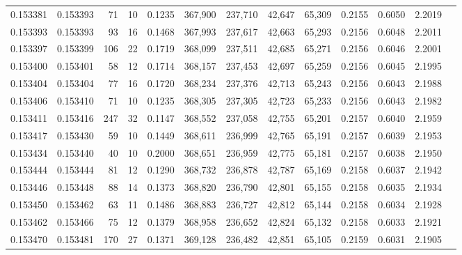 \begin{tabular}{rrrrrrrrrrrrr}
0.153381 & 0.153393 &    71 &  10 &                                     0.1235 & 367,900 & 237,710 &  42,647 &  65,309 & 0.2155 & 0.6050 & 2.2019 \\
0.153393 & 0.153393 &    93 &  16 &                                     0.1468 & 367,993 & 237,617 &  42,663 &  65,293 & 0.2156 & 0.6048 & 2.2011 \\
0.153397 & 0.153399 &   106 &  22 &                                     0.1719 & 368,099 & 237,511 &  42,685 &  65,271 & 0.2156 & 0.6046 & 2.2001 \\
0.153400 & 0.153401 &    58 &  12 &                                     0.1714 & 368,157 & 237,453 &  42,697 &  65,259 & 0.2156 & 0.6045 & 2.1995 \\
0.153404 & 0.153404 &    77 &  16 &                                     0.1720 & 368,234 & 237,376 &  42,713 &  65,243 & 0.2156 & 0.6043 & 2.1988 \\
0.153406 & 0.153410 &    71 &  10 &                                     0.1235 & 368,305 & 237,305 &  42,723 &  65,233 & 0.2156 & 0.6043 & 2.1982 \\
0.153411 & 0.153416 &   247 &  32 &                                     0.1147 & 368,552 & 237,058 &  42,755 &  65,201 & 0.2157 & 0.6040 & 2.1959 \\
0.153417 & 0.153430 &    59 &  10 &                                     0.1449 & 368,611 & 236,999 &  42,765 &  65,191 & 0.2157 & 0.6039 & 2.1953 \\
0.153434 & 0.153440 &    40 &  10 &                                     0.2000 & 368,651 & 236,959 &  42,775 &  65,181 & 0.2157 & 0.6038 & 2.1950 \\
0.153444 & 0.153444 &    81 &  12 &                                     0.1290 & 368,732 & 236,878 &  42,787 &  65,169 & 0.2158 & 0.6037 & 2.1942 \\
0.153446 & 0.153448 &    88 &  14 &                                     0.1373 & 368,820 & 236,790 &  42,801 &  65,155 & 0.2158 & 0.6035 & 2.1934 \\
0.153450 & 0.153462 &    63 &  11 &                                     0.1486 & 368,883 & 236,727 &  42,812 &  65,144 & 0.2158 & 0.6034 & 2.1928 \\
0.153462 & 0.153466 &    75 &  12 &                                     0.1379 & 368,958 & 236,652 &  42,824 &  65,132 & 0.2158 & 0.6033 & 2.1921 \\
0.153470 & 0.153481 &   170 &  27 &                                     0.1371 & 369,128 & 236,482 &  42,851 &  65,105 & 0.2159 & 0.6031 & 2.1905 \\

\end{tabular}
